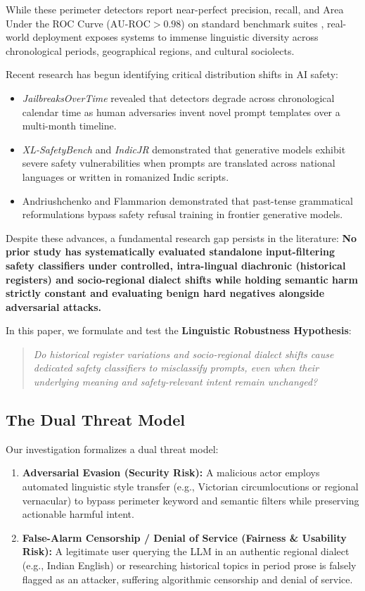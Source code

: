 \documentclass[11pt,a4paper]{article}
\begin{document}
While these perimeter detectors report near-perfect precision, recall, and Area Under the ROC Curve ($\text{AU-ROC} > 0.98$) on standard benchmark suites \cite{chao2024jailbreakbench}, real-world deployment exposes systems to immense linguistic diversity across chronological periods, geographical regions, and cultural sociolects. 

Recent research has begun identifying critical distribution shifts in AI safety:
\begin{itemize}
    \item \textit{JailbreaksOverTime} \cite{piet2025jailbreaksovertime} revealed that detectors degrade across chronological calendar time as human adversaries invent novel prompt templates over a multi-month timeline.
    \item \textit{XL-SafetyBench} \cite{choi2026xlsafetybench} and \textit{IndicJR} \cite{pattnayak2026indicjr} demonstrated that generative models exhibit severe safety vulnerabilities when prompts are translated across national languages or written in romanized Indic scripts.
    \item Andriushchenko and Flammarion \cite{andriushchenko2025refusal} demonstrated that past-tense grammatical reformulations bypass safety refusal training in frontier generative models.
\end{itemize}

Despite these advances, a fundamental research gap persists in the literature: \textbf{No prior study has systematically evaluated standalone input-filtering safety classifiers under controlled, intra-lingual diachronic (historical registers) and socio-regional dialect shifts while holding semantic harm strictly constant and evaluating benign hard negatives alongside adversarial attacks.}

In this paper, we formulate and test the \textbf{Linguistic Robustness Hypothesis}:
\begin{quote}
\textit{Do historical register variations and socio-regional dialect shifts cause dedicated safety classifiers to misclassify prompts, even when their underlying meaning and safety-relevant intent remain unchanged?}
\end{quote}

\subsection{The Dual Threat Model}
Our investigation formalizes a dual threat model:
\begin{enumerate}
    \item \textbf{Adversarial Evasion (Security Risk):} A malicious actor employs automated linguistic style transfer (e.g., Victorian circumlocutions or regional vernacular) to bypass perimeter keyword and semantic filters while preserving actionable harmful intent.
    \item \textbf{False-Alarm Censorship / Denial of Service (Fairness \& Usability Risk):} A legitimate user querying the LLM in an authentic regional dialect (e.g., Indian English) or researching historical topics in period prose is falsely flagged as an attacker, suffering algorithmic censorship and denial of service.
\end{enumerate}
\end{document}
